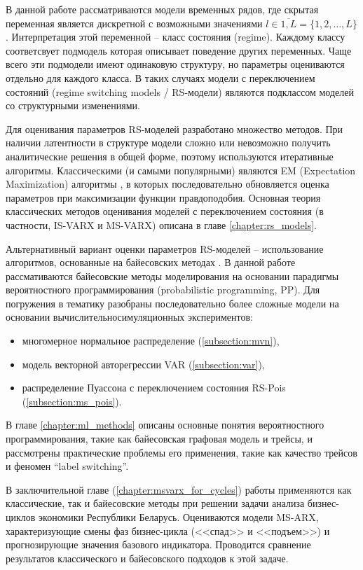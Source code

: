 \documentclass[a4paper,14pt]{extreport}
\begin{document}
В данной работе рассматриваются модели временных рядов, где скрытая переменная является дискретной с возможными значениями $l \in \overline{1,L} = \{1,2,\dots,L\}$. Интерпретация этой переменной -- класс состояния (regime). Каждому классу соответсвует подмодель которая описывает поведение других переменных. Чаще всего эти подмодели имеют одинаковую структуру, но параметры оцениваются отдельно для каждого класса. В таких случаях модели с переключением состояний (regime switching models / RS-модели) являются подклассом моделей со структурными изменениями.

Для оценивания параметров RS-моделей разработано множество методов. При наличии латентности в структуре модели сложно или невозможно получить аналитические решения в общей форме, поэтому используются итеративные алгоритмы. Классическими (и самыми популярными) являются EM (Expectation Maximization) алгоритмы \cite{malNovopMSVARX, malNovopHiddenMarkov, rs_hamilton_palgrave}, в которых последовательно обновляется оценка параметров при максимизации функции правдоподобия. Основная теория классических методов оценивания моделей с переключением состояния (в частности, IS-VARX и MS-VARX) описана в главе \ref{chapter:rs_models}.

Альтернативный вариант оценки параметров RS-моделей -- использование алгоритмов, основанные на байесовских методах \cite{rs_persio2014, rs_hamilton_palgrave}.
В данной работе рассмативаются байесовские методы моделирования на основании парадигмы вероятностного программирования (probabilistic programming, PP). 
Для погружения в тематику разобраны последовательно более сложные модели на основании вычислительно\-симуляционных экспериментов:

\begin{itemize}
	\item многомерное нормальное распределение (\ref{subsection:mvn}),
	\item модель векторной авторегрессии VAR (\ref{subsection:var}),
	\item распределение Пуассона с переключением состояния RS-Pois (\ref{subsection:ms_pois}).
\end{itemize}

\noindent
В главе \ref{chapter:ml_methods} описаны основные понятия вероятностного программирования, такие как байесовская графовая модель и трейсы, и рассмотрены практические проблемы его применения, такие как качество трейсов и феномен ``label switching''.

В заключительной главе (\ref{chapter:msvarx_for_cycles}) работы применяются как классические, так и байесовские методы при решении задачи анализа бизнес-циклов экономики Республики Беларусь. Оцениваются модели MS-ARX, характеризующие смены фаз бизнес-цикла (<<спад>> и <<подъем>>) и прогнозирующие значения базового индикатора. Проводится сравнение результатов классического и байесовского подходов к этой задаче.
\end{document}
